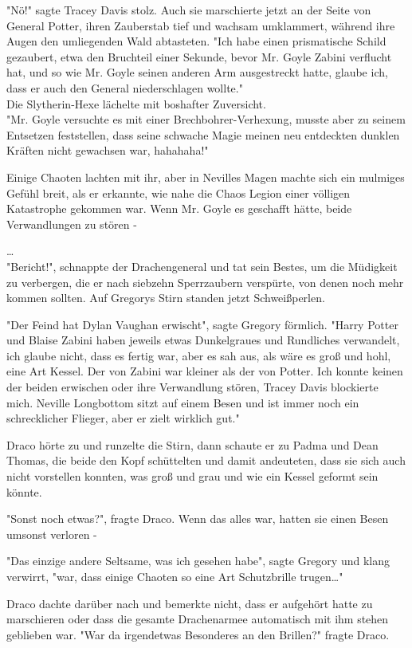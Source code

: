 {"Nö!" sagte Tracey Davis stolz. Auch sie marschierte jetzt an der Seite von General Potter, ihren Zauberstab tief und wachsam umklammert, während ihre Augen den umliegenden Wald abtasteten. "Ich habe einen prismatische Schild gezaubert, etwa den Bruchteil einer Sekunde, bevor Mr. Goyle Zabini verflucht hat, und so wie Mr. Goyle seinen anderen Arm ausgestreckt hatte, glaube ich, dass er auch den General niederschlagen wollte."\\ Die Slytherin-Hexe lächelte mit boshafter Zuversicht.\\ "Mr. Goyle versuchte es mit einer Brechbohrer-Verhexung, musste aber zu seinem Entsetzen feststellen, dass seine schwache Magie meinen neu entdeckten dunklen Kräften nicht gewachsen war, hahahaha!"

Einige Chaoten lachten mit ihr, aber in Nevilles Magen machte sich ein mulmiges Gefühl breit, als er erkannte, wie nahe die Chaos Legion einer völligen Katastrophe gekommen war. Wenn Mr. Goyle es geschafft hätte, beide Verwandlungen zu stören -

…\\ "Bericht!", schnappte der Drachengeneral und tat sein Bestes, um die Müdigkeit zu verbergen, die er nach siebzehn Sperrzaubern verspürte, von denen noch mehr kommen sollten. Auf Gregorys Stirn standen jetzt Schweißperlen.

"Der Feind hat Dylan Vaughan erwischt", sagte Gregory förmlich. "Harry Potter und Blaise Zabini haben jeweils etwas Dunkelgraues und Rundliches verwandelt, ich glaube nicht, dass es fertig war, aber es sah aus, als wäre es groß und hohl, eine Art Kessel. Der von Zabini war kleiner als der von Potter. Ich konnte keinen der beiden erwischen oder ihre Verwandlung stören, Tracey Davis blockierte mich. Neville Longbottom sitzt auf einem Besen und ist immer noch ein schrecklicher Flieger, aber er zielt wirklich gut."

Draco hörte zu und runzelte die Stirn, dann schaute er zu Padma und Dean Thomas, die beide den Kopf schüttelten und damit andeuteten, dass sie sich auch nicht vorstellen konnten, was groß und grau und wie ein Kessel geformt sein könnte.

"Sonst noch etwas?", fragte Draco. Wenn das alles war, hatten sie einen Besen umsonst verloren -

"Das einzige andere Seltsame, was ich gesehen habe", sagte Gregory und klang verwirrt, "war, dass einige Chaoten so eine Art Schutzbrille trugen…"

Draco dachte darüber nach und bemerkte nicht, dass er aufgehört hatte zu marschieren oder dass die gesamte Drachenarmee automatisch mit ihm stehen geblieben war. "War da irgendetwas Besonderes an den Brillen?" fragte Draco.

}
